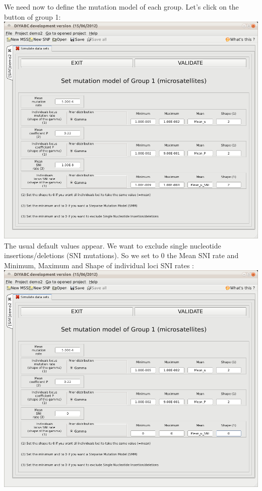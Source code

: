 We need now to define the mutation model of each group. Let's click on the  button of group 1:\\

\includegraphics[scale=0.33]{gui_pictures/Capture-DIYABC-80.png} \\

The usual default values appear. We want to exclude single nucleotide insertions/deletions (SNI mutations). So we set to 0 the Mean SNI rate and Minimum, Maximum and Shape of individual loci SNI rates :\\

\includegraphics[scale=0.33]{gui_pictures/Capture-DIYABC-81.png} \\


